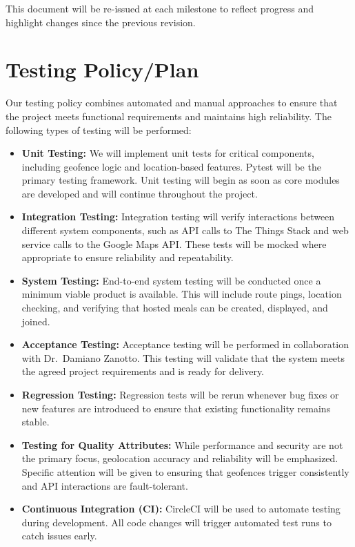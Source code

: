 \noindent
This document will be re-issued at each milestone to reflect progress and highlight 
changes since the previous revision.


\section{Testing Policy/Plan}
Our testing policy combines automated and manual approaches to ensure that the project 
meets functional requirements and maintains high reliability. The following types of testing 
will be performed:

\begin{itemize}
    \item \textbf{Unit Testing:} We will implement unit tests for critical components, 
    including geofence logic and location-based features. Pytest will be the primary 
    testing framework. Unit testing will begin as soon as core modules are developed 
    and will continue throughout the project.
    
    \item \textbf{Integration Testing:} Integration testing will verify interactions between 
    different system components, such as API calls to The Things Stack and web service 
    calls to the Google Maps API. These tests will be mocked where appropriate to ensure 
    reliability and repeatability.

    \item \textbf{System Testing:} End-to-end system testing will be conducted once a 
    minimum viable product is available. This will include route pings, location checking, 
    and verifying that hosted meals can be created, displayed, and joined.

    \item \textbf{Acceptance Testing:} Acceptance testing will be performed in collaboration 
    with Dr.~Damiano Zanotto. This testing will validate that the system meets the agreed 
    project requirements and is ready for delivery.

    \item \textbf{Regression Testing:} Regression tests will be rerun whenever bug fixes or 
    new features are introduced to ensure that existing functionality remains stable. 

    \item \textbf{Testing for Quality Attributes:} While performance and security are not the 
    primary focus, geolocation accuracy and reliability will be emphasized. Specific attention 
    will be given to ensuring that geofences trigger consistently and API interactions are 
    fault-tolerant.

    \item \textbf{Continuous Integration (CI):} CircleCI will be used to automate testing during 
    development. All code changes will trigger automated test runs to catch issues early.
\end{itemize}

